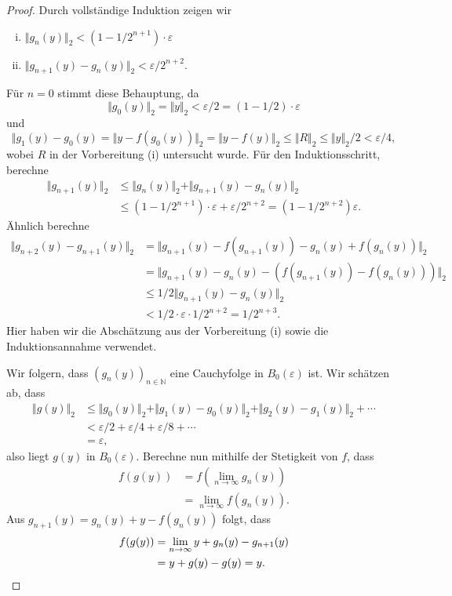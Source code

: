 \documentclass[../main.tex]{subfiles}
\begin{document}
\begin{proof}
  Durch vollständige Induktion zeigen wir
  \begin{enumerate}[(i)]
    \item $\Vert g_n(y) \Vert_2 < (1 - 1/2^{n+1}) \cdot \varepsilon$ 
    \item $\Vert g_{n+1}(y) - g_n(y) \Vert_2 < \varepsilon / 2^{n+2}$.
  \end{enumerate}
  Für $n = 0$ stimmt diese Behauptung, da
  \[
    \Vert g_0(y) \Vert_2 = \Vert y \Vert_2 < \varepsilon / 2 = (1 - 1/2)
    \cdot \varepsilon
  \]
  und
  \[
    \Vert g_1(y) - g_0(y) = \Vert y - f ( g_0(y)) \Vert_2
    = \Vert y - f(y) \Vert_2 \leq \Vert R \Vert_2
    \leq \Vert y \Vert_2 / 2 < \varepsilon / 4,
  \]
  wobei $R$ in der Vorbereitung (i) untersucht wurde.
  Für den Induktionsschritt, berechne
  \begin{align*}
    \Vert g_{n+1}(y) \Vert_2 
    &\leq  \Vert g_n(y) \Vert_2 + \Vert g_{n+1}(y) - g_n(y) \Vert_2 \\
    &\leq (1 - 1/2^{n+1}) \cdot \varepsilon
    + \varepsilon / 2^{n+2} = (1 - 1/2^{n+2}) \varepsilon.
  \end{align*}
  Ähnlich berechne
  \begin{align*}
    \Vert g_{n+2}(y) - g_{n+1}(y) \Vert_2 
    &= \Vert g_{n+1}(y) - f(g_{n+1}(y)) - g_n(y) + f(g_n(y)) \Vert_2  \\
    &= \Vert g_{n+1}(y) - g_n(y) - (f(g_{n+1}(y)) - f(g_n(y))) \Vert_2 \\
    &\leq 1/2 \Vert g_{n+1}(y) - g_n(y) \Vert_2 \\
    &< 1/2 \cdot \varepsilon \cdot 1/2^{n+2} = 1/2^{n+3}.
  \end{align*}
  Hier haben wir die Abschätzung aus der Vorbereitung (i)
  sowie die Induktionsannahme verwendet.

  Wir folgern, dass $(g_n(y))_{n \in \mathbb{N}}$ eine Cauchyfolge in
  $B_0(\varepsilon)$ ist.
  Wir schätzen ab, dass
  \begin{align*}
    \Vert g(y) \Vert_2
    & \leq \Vert g_0(y) \Vert_2 +
    \Vert g_1(y) - g_0(y) \Vert_2
    + \Vert g_2(y) - g_1(y) \Vert_2 + \cdots \\
    &< \varepsilon/2 + \varepsilon/4 + \varepsilon/8 + \cdots \\
    &= \varepsilon,
  \end{align*}
  also liegt $g(y)$ in $B_0(\varepsilon)$.
  Berechne nun mithilfe der Stetigkeit von $f$, dass
  \begin{align*}
    f(g(y))
    & = f \left( \lim_{n \to \infty}g_n(y) \right)\\
    &= \lim_{n \to \infty} f(g_n(y)).
  \end{align*}
  Aus $g_{n+1}(y) = g_n(y) + y - f(g_n(y))$ folgt, dass
  \begin{align*}
    f(g(y)) 
    &= \lim_{n \to \infty} y + g_n(y) - g_{n+1}(y)  \\
    &= y + g(y) - g(y) = y. \qedhere
  \end{align*}
\end{proof}
\end{document}
